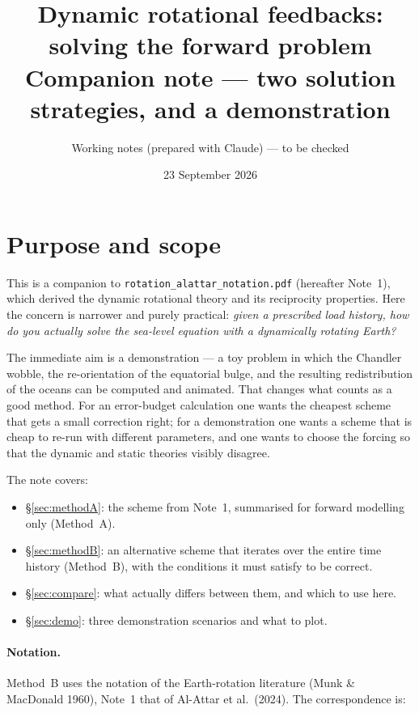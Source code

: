 \documentclass[11pt,a4paper]{article}
\title{Dynamic rotational feedbacks: solving the forward problem\\[4pt]
\large Companion note --- two solution strategies, and a demonstration}
\author{Working notes (prepared with Claude) --- to be checked}
\date{23 September 2026}
\begin{document}
\maketitle

\tableofcontents

\section{Purpose and scope}

This is a companion to \texttt{rotation\_alattar\_notation.pdf} (hereafter Note~1), which derived the
dynamic rotational theory and its reciprocity properties. Here the concern is narrower and purely
practical: \emph{given a prescribed load history, how do you actually solve the sea-level equation
with a dynamically rotating Earth?}

The immediate aim is a demonstration --- a toy problem in which the Chandler wobble, the
re-orientation of the equatorial bulge, and the resulting redistribution of the oceans can be
computed and animated. That changes what counts as a good method. For an error-budget calculation
one wants the cheapest scheme that gets a small correction right; for a demonstration one wants a
scheme that is cheap to re-run with different parameters, and one wants to choose the forcing so
that the dynamic and static theories visibly disagree.

The note covers:
\begin{itemize}
  \item \S\ref{sec:methodA}: the scheme from Note~1, summarised for forward modelling only (Method~A).
  \item \S\ref{sec:methodB}: an alternative scheme that iterates over the entire time history
  (Method~B), with the conditions it must satisfy to be correct.
  \item \S\ref{sec:compare}: what actually differs between them, and which to use here.
  \item \S\ref{sec:demo}: three demonstration scenarios and what to plot.
\end{itemize}

\paragraph{Notation.} Method~B uses the notation of the Earth-rotation literature (Munk \&
MacDonald 1960), Note~1 that of Al-Attar et al.\ (2024). The correspondence is:
\end{document}
